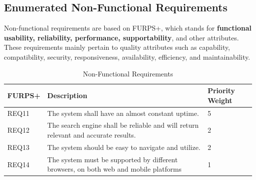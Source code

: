 \documentclass{scrartcl}
\begin{document}
\subsection{Enumerated Non-Functional Requirements}
Non-functional requirements are based on FURPS+, which stands for \textbf{functional usability, reliability, performance, supportability}, and other attributes.
These requirements  mainly pertain to quality attributes such as capability, compatibility, security, responsiveness, availability, efficiency, and maintainability.


\begin{table}[H]
\begin{center}
\begin{tabular}{| p{2.5cm}| p{7.5cm} |p{2.5cm}|}
\hline
\textbf{FURPS+}
\textbf{} & \textbf{Description}& \textbf{Priority Weight} \\
\hline
REQ11                    &       The system shall have an almost constant uptime.      	&  5 \\ \hline
REQ12                   &      The search engine shall be reliable and will return relevant and accurate results.       	&  2 \\ \hline
REQ13                   &         The system should be easy to navigate and utilize.    	&  2 \\ \hline
REQ14                    &         The system must be  supported by different browsers, on both web and mobile platforms  	& 1\\ \hline
\end{tabular}
\end{center}
\caption{Non-Functional Requirements }
\label{table2}
\end{table}



\end{document}
